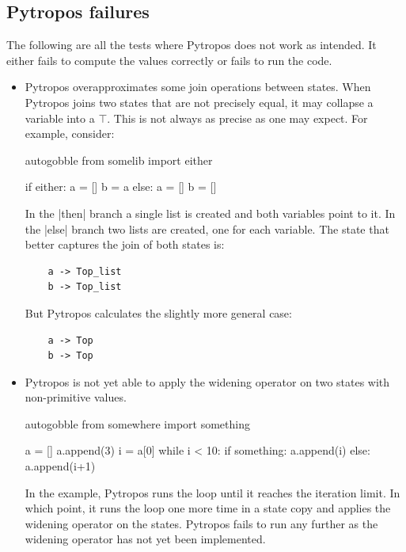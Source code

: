 \subsection*{Pytropos failures}

The following are all the tests where Pytropos does not work as intended. It either fails to compute the values correctly or fails to run the code.

\begin{itemize}

\item Pytropos overapproximates some join operations between states.
  When Pytropos joins two states that are not precisely equal, it may collapse a
  variable into a $\top$. This is not always as precise as one may expect. For example,
  consider:

  \begin{pythoncode*}{autogobble}
    from somelib import either

    if either:
        a = []
        b = a
    else:
        a = []
        b = []
  \end{pythoncode*}

  In the \pycode|then| branch a single list is created and both variables point to it.
  In the \pycode|else| branch two lists are created, one for each variable. The state that
  better captures the join of both states is:

  \begin{verbatim}
    a -> Top_list
    b -> Top_list
  \end{verbatim}

  But Pytropos calculates the slightly more general case:

  \begin{verbatim}
    a -> Top
    b -> Top
  \end{verbatim}

\item Pytropos is not yet able to apply the widening operator on two states with
  non-primitive values.

  \begin{pythoncode*}{autogobble}
     from somewhere import something

     a = []
     a.append(3)
     i = a[0]
     while i < 10:
         if something:
             a.append(i)
         else:
             a.append(i+1)
  \end{pythoncode*}

  In the example, Pytropos runs the loop until it reaches the iteration limit. In which
  point, it runs the loop one more time in a state copy and applies the widening operator
  on the states. Pytropos fails to run any further as the widening operator has not yet
  been implemented.


\end{itemize}
